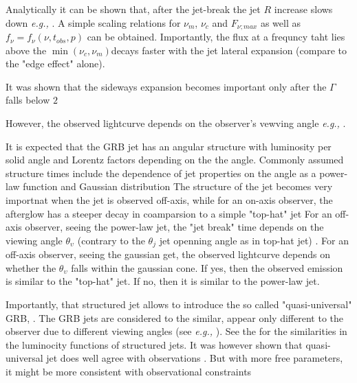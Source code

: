 Analytically it can be shown that, after the jet-break the jet $R$ increase slows down \textit{e.g.,}
\cite{Rhoads (1999); Sari et al.(1999); Piran (2000); Granot and Piran (2012)}.
A simple scaling relations for $\nu_m$, $\nu_c$ and $F_{\nu;max}$ as well as $f_{\nu}=f_{\nu}(\nu, t_{obs}, p)$ can be obtained.
Importantly, the flux at a frequncy taht lies above the $\min(\nu_c,\nu_m)$decays faster with the jet lateral expansion (compare to the "edge effect" alone).

It was shown that the sideways expansion becomes important only after the $\Gamma$ falls below $2$ \cite{(Granot et al., 2001; Kumar and Granot, 2003; Cannizzo et al., 2004; Zhang and MacFadyen, 2009; De Colle et al., 2012; Granot and Piran, 2012; van Eerten and MacFadyen, 2012; van Eerten et al., 2012)}

However, the observed lightcurve depends on the observer's vewving angle \textit{e.g.,} \cite{Zhang et al., 2014b; Ryan et al., 2014).}.


It is expected that the GRB jet has an angular structure with luminosity per solid angle and Lorentz factors depending on the the angle.
Commonly assumed structure times include the dependence of jet properties on the angle as a power-law function
\cite{(Meszaros et al., 1998; Rossi et al., 2002; Zhang and Meszaros, 2002b)} 
and Gaussian distribution 
\cite{(Zhang and Meszaros, 2002b; Kumar and Granot, 2003; Zhang et al., 2004a).}
The structure of the jet becomes very importnat when the jet is observed off-axis, while for an on-axis observer, the afterglow has a steeper decay in coamparsion to a simple "top-hat" jet \cite{Meszaros et al., 1998; Dai and Gou, 2001; Panaitescu, 2005}
For an off-axis observer, seeing the power-law jet, the "jet break" time depends on the viewing angle $\theta_{\upsilon}$ (contrary to the $\theta_j$ jet openning angle as in top-hat jet)
\cite{Zhang and Meszaros, 2002b; Rossi et al., 2002; Kumar and Granot, 2003; Granot and Kumar, 2003}.
For an off-axis observer, seeing the gaussian get, the observed lightcurve depends on whether the $\theta_{\upsilon}$ falls within the gaussian cone. If yes, then the observed emission is similar to the "top-hat" jet. If no, then it is similar to the power-law jet.
\cite{Kumar and Granot, 2003; Granot and Kumar, 2003}

Importantly, that structured jet allows to introduce the so called "quasi-universal" GRB, \cite{(Rossi et al., 2002; Zhang and Meszaros, 2002b; Zhang et al., 2004a)}. The GRB jets are considered to the similar, appear only different to the observer due to different viewing angles (see \textit{e.g.,} \cite{Zhang and Meszaros, 2002b}).
See the \cite{(Zhang and Meszaros, 2002b; Rossi et al., 2002} for the similarities in the luminocity functions of structured jets. 
It was however shown that quasi-universal jet does well agree with observations \cite{(Nakar et al., 2004}. But with more free parameters, it might be more consistent with observational constraints \cite{(Lloyd-Ronning et al., 2004; Zhang et al., 2004a; Dai and Zhang, 2005)}

